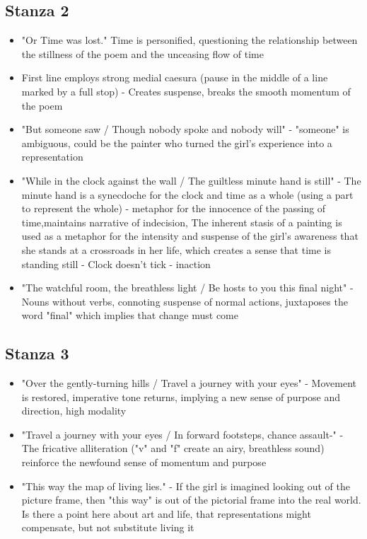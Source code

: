 	\subsection{Stanza 2}
		\begin{itemize}
			\item "Or Time was lost." Time is personified, questioning the relationship between the stillness of the poem and the unceasing flow of time
			\item First line employs strong medial caesura (pause in the middle of a line marked by a full stop) - Creates suspense, breaks the smooth momentum of the poem
			\item "But someone saw / Though nobody spoke and nobody will" - "someone" is ambiguous, could be the painter who turned the girl's experience into a representation
			\item "While in the clock against the wall / The guiltless minute hand is still" - The minute hand is a synecdoche for the clock and time as a whole (using a part to represent the whole) - metaphor for the innocence of the passing of time,maintains narrative of indecision, The inherent stasis of a painting is used as a metaphor for the intensity and suspense of the girl's awareness that she stands at a crossroads in her life, which creates a sense that time is standing still - Clock doesn't tick - inaction
			\item "The watchful room, the breathless light / Be hosts to you this final night" - Nouns without verbs, connoting suspense of normal actions, juxtaposes the word "final" which implies that change must come
		\end{itemize}

	\subsection{Stanza 3}
		\begin{itemize}
			\item "Over the gently-turning hills / Travel a journey with your eyes" - Movement is restored, imperative tone returns, implying a new sense of purpose and direction, high modality
			\item "Travel a journey with your eyes / In forward footsteps, chance assault-" - The fricative alliteration ("v" and "f" create an airy, breathless sound) reinforce the newfound sense of momentum and purpose
			\item "This way the map of living lies." - If the girl is imagined looking out of the picture frame, then "this way" is out of the pictorial frame into the real world. Is there a point here about art and life, that representations might compensate, but not substitute living it
		\end{itemize}

